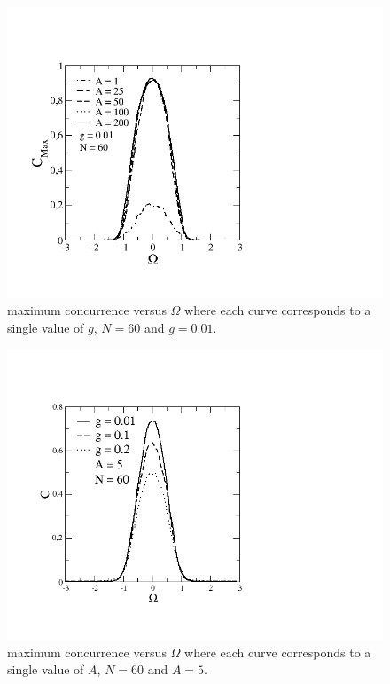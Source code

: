 \documentclass{comjnl}
\begin{document}
\begin{figure}[ht]
  \centering
  \includegraphics[width= \linewidth]{concorrencia.png}
  \caption{maximum concurrence versus $\Omega$ where each curve corresponds to a single value of $g$, $N = 60$ and $g = 0.01$.}
\end{figure}

\begin{figure}[ht]
  \centering
  \includegraphics[width= \linewidth]{cga5.png}
  \caption{maximum concurrence versus $\Omega$ where each curve corresponds to a single value of $A$, $N = 60$ and $A = 5$.}
\end{figure}
\end{document}
